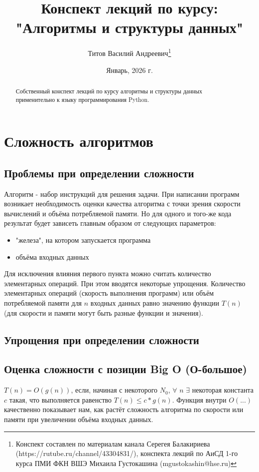 \documentclass{article}
\title{Конспект лекций по курсу:\\ "Алгоритмы и структуры данных"}
\author{Титов Василий Андреевич\thanks{Конспект составлен по материалам канала Серегея Балакириева (https://rutube.ru/channel/43304831/), конспекта лекций по АиСД 1-го курса ПМИ ФКН ВШЭ Михаила Густокашина (mgustokashin@hse.ru)}}
\date{Январь, 2026 г.}
\begin{document}
\maketitle

\tableofcontents

\begin{abstract}
    Собственный конспект лекций по курсу алгоритмы и структуры данных применительно к языку программирования Python.
\end{abstract}

\section{Сложность алгоритмов}
\subsection{Проблемы при определении сложности}
    Алгоритм - набор инструкций для решения задачи.
    При написании программ возникает необходимость оценки качества алгоритма с точки зрения скорости вычислений и объёма потребляемой памяти.
Но для одного и того-же кода результат будет зависеть главным образом от следующих параметров:
\begin{itemize}
    \item "железа", на котором запускается программа
    \item объёма входных данных
\end{itemize}
Для исключения влияния первого пункта можно считать количество элементарных операций.
При этом вводятся некоторые упрощения.
Количество элементарных операций (скорость выполнения программ) или объём потребляемой памяти для $n$ 
входных данных равно значению функции $T(n)$ (для скорости и памяти могут быть разные функции и значения).

\subsection{Упрощения при определении сложности}

\subsection{Оценка сложности с позиции Big O (О-большое)}
$T(n)=O(g(n))$, если, начиная с некоторого $N_0$, $\forall$ $n$ $\exists$ некоторая константа $c$ такая, что 
выполняется равенство $T(n) \leq c * g(n)$.
Функция внутри $O(...)$ качественно показывает нам, как растёт сложность алгоритма по скорости или памяти при увеличении объёма входных данных.
\end{document}
